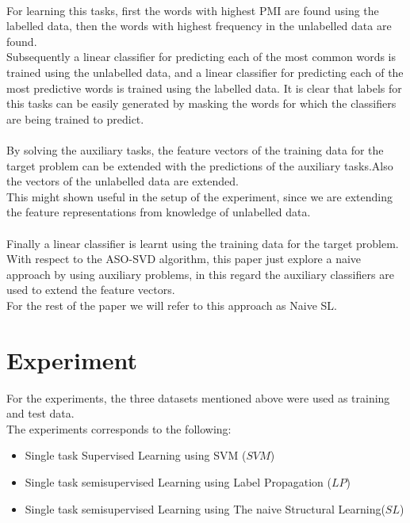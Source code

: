 \documentclass[4pt,a4paper,twocolumn]{article}
\begin{document}
\\
For learning this tasks, first the words with highest PMI are found using the labelled data, then the words with highest frequency in the unlabelled data are found.\\
Subsequently a linear classifier for predicting each of the most common words is trained using the unlabelled data, and a linear classifier for predicting each of the most predictive words is trained using the labelled data.
It is clear that labels for this tasks can be easily generated by masking the words for which the classifiers are being trained to predict.\\
\\
By solving the auxiliary tasks, the feature vectors of the training data for the target problem can be extended with the predictions of the auxiliary tasks.Also the vectors of the unlabelled data are extended.\\
This might shown useful in the setup of the experiment, since we are extending the feature representations from knowledge of unlabelled data.\\
\\
Finally a linear classifier is learnt using the training data for the target problem.\\
With respect to the ASO-SVD algorithm, this paper just explore a naive approach by using auxiliary problems, in this regard the auxiliary classifiers are used to extend the feature vectors.\\
For the rest of the paper we will refer to this approach as Naive SL.


\section{Experiment}
For the experiments, the three datasets mentioned above were used as training and test data.\\
The experiments corresponds to the following:
\begin{itemize}
	\item Single task Supervised Learning using SVM ($SVM$)
	\item Single task semisupervised Learning using Label Propagation ($LP$)
	\item Single task semisupervised Learning using The naive Structural Learning($SL$)
	
\end{itemize}
\end{document}
